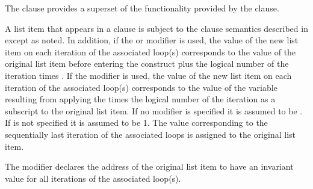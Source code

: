 \descr
The  clause provides a superset of the functionality provided by the  
clause.

A list item that appears in a  clause is subject to the  clause semantics 
described in 
except as noted. In addition, if the  or  modifier is used, the value of the 
new list item on each iteration of the associated loop(s) corresponds to the value of the 
original list item before entering the construct plus the logical number of the iteration 
times . If the  modifier is used, the value of the new list item on each iteration of the associated loop(s) corresponds to the value of the variable resulting from applying  the  times the logical number of the iteration as a subscript to the original list item. If no modifier is specified it is assumed to be .
If  is not specified it is assumed to be 1. The value 
corresponding to the sequentially last iteration of the associated loops is assigned to the 
original list item.

The  modifier declares the address of the original list item to have an invariant value for all iterations of the associated loop(s).

